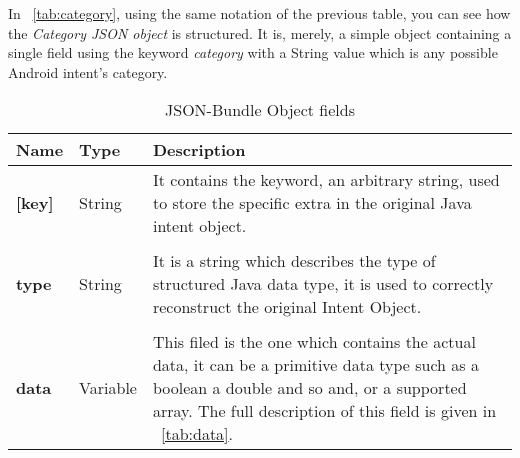 In \tablename~\ref{tab:category}, using the same notation of the previous table, you can see how the \textit{Category JSON object} is structured. It is, merely, a simple object containing a single field using the keyword \textit{category} with a String value which is any possible Android intent's category.
\begin{table}[h!]
	\caption{JSON-Bundle Object fields}
	\label{tab:Bundle}
	\centering
	\begin{center}
		
		\begin{tabular}{>{\centering\arraybackslash} m{}p{}p{}}
			
			\toprule
			\centering\textbf{Name} & \centering\textbf{Type}  &	\textbf{Description} \\
			\midrule
			\centering\textbf{[key]\footnotemark[1]} & \begin{minipage}[t]{0.25\textwidth}
				\centering
				String
			\end{minipage} & \begin{minipage}[t]{0.55\textwidth}
				It contains the keyword, an arbitrary string, used to store the specific extra in the original Java intent object.
			\end{minipage}\\%
			&&\\
			\centering\textbf{type} & \begin{minipage}[t]{0.25\textwidth}
				\centering
				String
			\end{minipage} & \begin{minipage}[t]{0.55\textwidth}
				It is a string which describes the type of structured Java data type, it is used to correctly reconstruct the original Intent Object.
			\end{minipage}\\%
			&&\\
			\centering\textbf{data} & \begin{minipage}[t]{0.25\textwidth}
				\centering
				Variable
			\end{minipage} & \begin{minipage}[t]{0.55\textwidth}
				This filed is the one which contains the actual data, it can be a primitive data type such as a boolean a double and so and, or a supported array. The full description of this field is given in \tablename~\ref{tab:data}.
			\end{minipage}\\%
			\bottomrule
			
		\end{tabular}
	\end{center}
\end{table}
